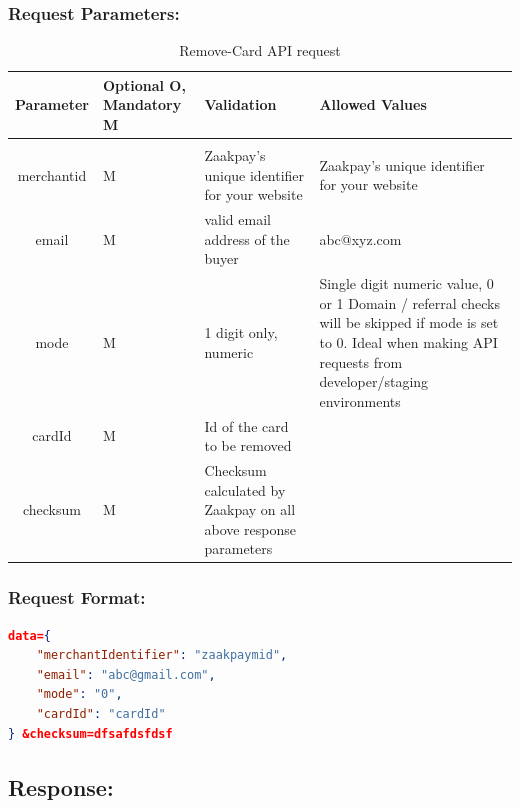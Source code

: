 \documentclass{article}
\begin{document}
\subsubsection{Request Parameters:}
\begin{longtable}{||c| p{2.09cm}|| p{5.5cm}| p{4.7cm}||}
   \caption{Remove-Card API request}\\
   \rowcolor{green!50}
    \bfseries{Parameter} & \bfseries{Optional O, Mandatory M} & \bfseries{Validation} & \bfseries{Allowed Values} \\ \hline
&&&\\
merchantid & M& Zaakpay's unique identifier for your website&Zaakpay's   unique   identifier   for your website \\
email & M& valid   email   address   of   the buyer& abc@xyz.com\\
mode & M& 1 digit only, numeric &  Single digit numeric value, 0 or 1 Domain / referral checks will be skipped if mode is set   to   0. Ideal when making API requests from developer/staging environments \\
cardId  &M&Id of the card to be removed&  \\
checksum &M& Checksum calculated by Zaakpay on all above response parameters&  \\


\end{longtable}
\subsubsection{Request Format:}
\begin{lstlisting}[language=json,breaklines=true]
data={ 
    "merchantIdentifier": "zaakpaymid", 
    "email": "abc@gmail.com", 
    "mode": "0", 
    "cardId": "cardId" 
} &checksum=dfsafdsfdsf 
\end{lstlisting}
\newpage
\subsection{Response:}
\end{document}
